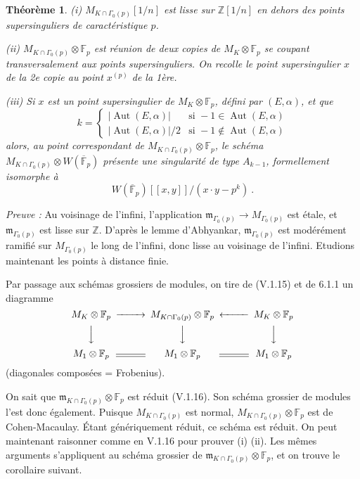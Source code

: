 \documentclass[10pt,a4paper]{amsart}
\theoremstyle{plain}
\newtheorem{theorem}{Th\'eor\`eme}[section]
\theoremstyle{definition}
\DeclareMathOperator{\Aut}{Aut}
\newcommand{\m}{\mathfrak{m}}
\newcommand{\FF}{\mathbb{F}}
\newcommand{\ZZ}{\mathbb{Z}}
\begin{document}
\setcounter{theorem}{8}
\begin{theorem}
\emph{(i)} $M_{K \cap \Gamma_0(p)}[1/n]$ est lisse sur $\ZZ[1/n]$ en dehors des points supersinguliers de caract\'eristique $p$.

\emph{(ii)} $M_{K \cap \Gamma_0(p)} \otimes \FF_p$ est r\'eunion de deux copies de $M_K \otimes \FF_p$ se coupant transversalement aux points supersinguliers. On recolle le point supersingulier $x$ de la 2e copie au point $x^{(p)}$ de la 1\`ere.

\emph{(iii)} Si $x$ est un point supersingulier de $M_K \otimes \FF_p$, d\'efini par $(E,\alpha)$, et que
\[
k = \begin{cases}
|\Aut(E,\alpha)| & \text{si } -1 \in \Aut(E,\alpha)\\
|\Aut(E,\alpha)|/2 & \text{si } -1 \not\in \Aut(E,\alpha)
\end{cases}
\]
alors, au point correspondant de $M_{K \cap \Gamma_0(p)} \otimes \FF_p$, le sch\'ema $M_{K \cap \Gamma_0(p)} \otimes W(\overline{\FF}_p)$ pr\'esente une singularit\'e de type $A_{k-1}$, formellement isomorphe \`a
\begin{equation}
W(\overline{\FF}_p)[[x,y]]/(x \cdot y - p^k)\ .
\end{equation}
\end{theorem}

\noindent\emph{Preuve :} Au voisinage de l'infini, l'application $\m_{\Gamma_0(p)} \to M_{\Gamma_0(p)}$ est \'etale, et $\m_{\Gamma_0(p)}$ est lisse sur $\ZZ$. D'apr\`es le lemme d'Abhyankar, $\m_{\Gamma_0(p)}$ est mod\'er\'ement ramifi\'e sur $M_{\Gamma_0(p)}$ le long de l'infini, donc lisse au voisinage de l'infini. Etudions maintenant les points \`a distance finie.

Par passage aux sch\'emas grossiers de modules, on tire de (V.1.15) et de 6.1.1 un diagramme
\[
\begin{CD}
M_K \otimes \FF_p @>>> M_{K \cap \Gamma_0(p)} \otimes \FF_p @<<< M_K \otimes \FF_p \\
@VVV @VVV @VVV \\
M_1 \otimes \FF_p @= M_1 \otimes \FF_p @= M_1 \otimes \FF_p
\end{CD}
\]
(diagonales compos\'ees = Frobenius).

On sait que $\m_{K \cap \Gamma_0(p)} \otimes \FF_p$ est r\'eduit (V.1.16). Son sch\'ema grossier de modules l'est donc \'egalement. Puisque $M_{K \cap \Gamma_0(p)}$ est normal, $M_{K \cap \Gamma_0(p)} \otimes \FF_p$ est de Cohen-Macaulay. \'Etant g\'en\'eriquement r\'eduit, ce sch\'ema est r\'eduit. On peut maintenant raisonner comme en V.1.16 pour prouver (i) (ii). Les m\^emes arguments s'appliquent au sch\'ema grossier de $\m_{K \cap \Gamma_0(p)} \otimes \FF_p$, et on trouve le corollaire suivant.
\end{document}
